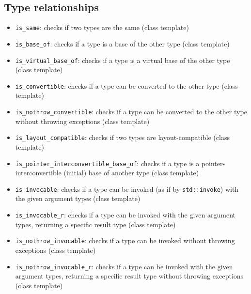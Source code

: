 \documentclass{report}
\begin{document}
        \pagebreak 
        \subsection{Type relationships}
        \begin{itemize}
            \item \texttt{is\_same}: checks if two types are the same (class template)
            \item \texttt{is\_base\_of}: checks if a type is a base of the other type (class template)
            \item \texttt{is\_virtual\_base\_of}: checks if a type is a virtual base of the other type (class template)
            \item \texttt{is\_convertible}: checks if a type can be converted to the other type (class template)
            \item \texttt{is\_nothrow\_convertible}: checks if a type can be converted to the other type without throwing exceptions (class template)
            \item \texttt{is\_layout\_compatible}: checks if two types are layout-compatible (class template)
            \item \texttt{is\_pointer\_interconvertible\_base\_of}: checks if a type is a pointer-interconvertible (initial) base of another type (class template)
            \item \texttt{is\_invocable}: checks if a type can be invoked (as if by \texttt{std::invoke}) with the given argument types (class template)
            \item \texttt{is\_invocable\_r}: checks if a type can be invoked with the given argument types, returning a specific result type (class template)
            \item \texttt{is\_nothrow\_invocable}: checks if a type can be invoked without throwing exceptions (class template)
            \item \texttt{is\_nothrow\_invocable\_r}: checks if a type can be invoked with the given argument types, returning a specific result type without throwing exceptions (class template)
        \end{itemize}

        \bigbreak \noindent 
\end{document}
